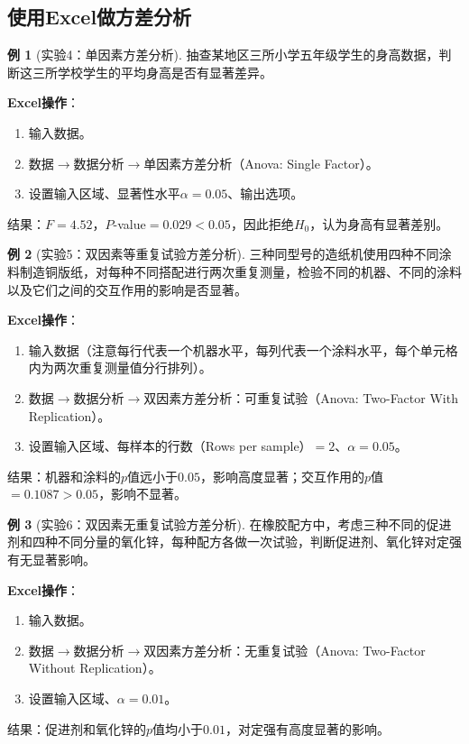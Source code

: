 \documentclass[11pt,a4paper]{report}
\theoremstyle{definition}
\newtheorem{example}{例}[chapter]
\theoremstyle{plain}
\begin{document}
\subsection{使用Excel做方差分析}

\begin{example}[实验4：单因素方差分析]
抽查某地区三所小学五年级学生的身高数据，判断这三所学校学生的平均身高是否有显著差异。

\textbf{Excel操作}：
\begin{enumerate}[label=\arabic*.,leftmargin=2em]
    \item 输入数据。
    \item 数据$\to$数据分析$\to$单因素方差分析（Anova: Single Factor）。
    \item 设置输入区域、显著性水平$\alpha=0.05$、输出选项。
\end{enumerate}

结果：$F=4.52$，$P$-value$=0.029<0.05$，因此拒绝$H_0$，认为身高有显著差别。
\end{example}

\begin{example}[实验5：双因素等重复试验方差分析]
三种同型号的造纸机使用四种不同涂料制造铜版纸，对每种不同搭配进行两次重复测量，检验不同的机器、不同的涂料以及它们之间的交互作用的影响是否显著。

\textbf{Excel操作}：
\begin{enumerate}[label=\arabic*.,leftmargin=2em]
    \item 输入数据（注意每行代表一个机器水平，每列代表一个涂料水平，每个单元格内为两次重复测量值分行排列）。
    \item 数据$\to$数据分析$\to$双因素方差分析：可重复试验（Anova: Two-Factor With Replication）。
    \item 设置输入区域、每样本的行数（Rows per sample）$=2$、$\alpha=0.05$。
\end{enumerate}

结果：机器和涂料的$p$值远小于$0.05$，影响高度显著；交互作用的$p$值$=0.1087>0.05$，影响不显著。
\end{example}

\begin{example}[实验6：双因素无重复试验方差分析]
在橡胶配方中，考虑三种不同的促进剂和四种不同分量的氧化锌，每种配方各做一次试验，判断促进剂、氧化锌对定强有无显著影响。

\textbf{Excel操作}：
\begin{enumerate}[label=\arabic*.,leftmargin=2em]
    \item 输入数据。
    \item 数据$\to$数据分析$\to$双因素方差分析：无重复试验（Anova: Two-Factor Without Replication）。
    \item 设置输入区域、$\alpha=0.01$。
\end{enumerate}

结果：促进剂和氧化锌的$p$值均小于$0.01$，对定强有高度显著的影响。
\end{example}
\end{document}
